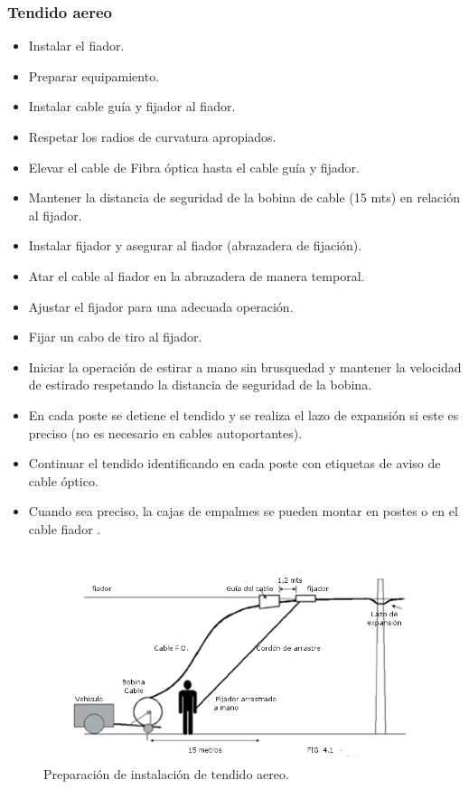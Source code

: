 \documentclass[12pt,letterpaper]{article}
\begin{document}
\subsubsection{Tendido aereo}
\begin{itemize}
    \item Instalar el fiador.
    \item Preparar equipamiento.
    \item Instalar cable guía y fijador al fiador.
    \item Respetar los radios de curvatura apropiados.
    \item Elevar el cable de Fibra óptica hasta el cable guía y fijador.
    \item Mantener la distancia de seguridad de la bobina de cable (15 mts) en relación 
    al fijador.
    \item Instalar fijador y asegurar al fiador (abrazadera de fijación).
    \item Atar el cable al fiador en la abrazadera de manera temporal.
    \item Ajustar el fijador para una adecuada operación.
    \item Fijar un cabo de tiro al fijador.
    \item Iniciar la operación de estirar a mano sin brusquedad y mantener la velocidad de 
    estirado respetando la distancia de seguridad de la bobina.
    \item En cada poste se detiene el tendido y se realiza el lazo de expansión 
     si este es preciso (no es necesario en cables autoportantes).
    \item Continuar el tendido identificando en cada poste con etiquetas de aviso de cable 
    óptico.
    \item Cuando sea preciso, la cajas de empalmes se pueden montar en postes 
     o en el cable fiador .
\end{itemize}
\begin{figure}[ht]
    \centering
    \includegraphics[width=.8\textwidth]{imagenes/ta0.jpg}
    \caption{Preparación de instalación de tendido aereo.}
\end{figure}
\end{document}

